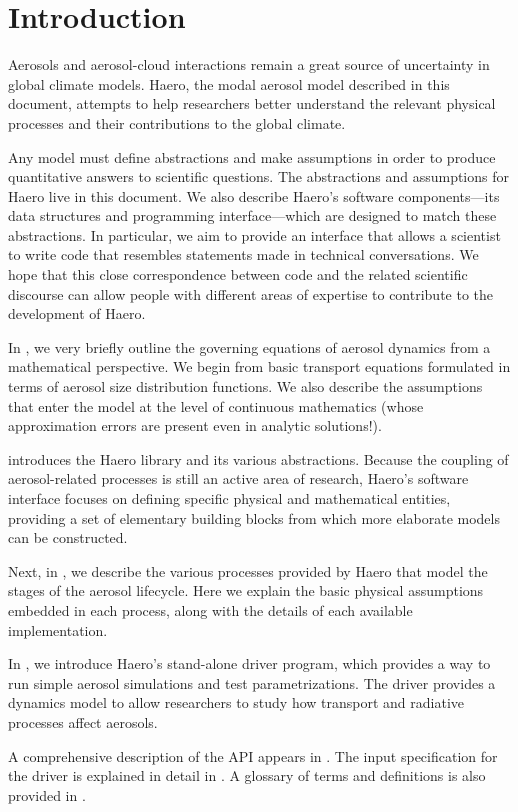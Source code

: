 \chapter{Introduction}

Aerosols and aerosol-cloud interactions remain a great source of uncertainty
in global climate models. Haero, the modal aerosol model described in this
document, attempts to help researchers better understand the relevant physical
processes and their contributions to the global climate.

Any model must define abstractions and make assumptions in order to produce
quantitative answers to scientific questions. The abstractions and assumptions
for Haero live in this document. We also describe Haero's software
components---its data structures and programming interface---which are designed
to match these abstractions. In particular, we aim to provide an interface that
allows a scientist to write code that resembles statements made in technical
conversations. We hope that this close correspondence between code and
the related scientific discourse can allow people with different areas of
expertise to contribute to the development of Haero.

In , we very briefly outline the governing equations of
aerosol dynamics from a mathematical perspective. We begin from basic transport
equations formulated in terms of aerosol size distribution functions. We also
describe the assumptions that enter the model at the level of continuous
mathematics (whose approximation errors are present even in analytic
solutions!).

 introduces the Haero library and its various abstractions.
Because the coupling of aerosol-related processes is still an active area of
research, Haero's software interface focuses on defining specific physical and
mathematical entities, providing a set of elementary building blocks from which
more elaborate models can be constructed.

Next, in , we describe the various processes provided by
Haero that model the stages of the aerosol lifecycle. Here we explain the basic
physical assumptions embedded in each process, along with the details of each
available implementation.

In , we introduce Haero's stand-alone driver program, which
provides a way to run simple aerosol simulations and test parametrizations.
The driver provides a dynamics model to allow researchers to study how transport
and radiative processes affect aerosols.

A comprehensive description of the API appears in . The input
specification for the driver is explained in detail in .
A glossary of terms and definitions is also provided in .

